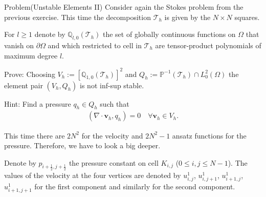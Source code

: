 \begin {blocktheorem}{Problem}(Unstable Elements II)
Consider again the Stokes problem from the previous exercise. This time the
decomposition $\mathcal{T}_h$ is given by the $N\times N$ squares.

For $l \geq 1$ denote by $\mathbb{Q}_{l,0}(\mathcal{T}_h)$ the set of globally
continuous functions on $\Omega$ that vanish on $\partial\Omega$ and which
restricted to cell in $\mathcal{T}_h$ are tensor-product polynomials of
maximum degree $l$.

Prove: Choosing $V_h:= [\mathbb{Q}_{1,0}(\mathcal{T}_h)]^2$ and
 $Q_h:=\mathbb{P}^{-1}(\mathcal{T}_h)\cap L_0^2(\Omega)$ the element pair
 $(V_h, Q_h)$ is not inf-sup stable.

Hint: Find a pressure $q_h\in Q_h$ such that
\begin{align*}
 (\nabla \cdot \boldsymbol{v}_h, q_h)=0 \quad \forall \boldsymbol{v}_h\in V_h.
\end{align*}
\begin{solution}
This time there are $2N^2$ for the velocity and $2N^2-1$ ansatz functions for
the pressure. Therefore, we have to look a big deeper.

Denote by $p_{i+\frac12, j+\frac12}$ the pressure constant on cell $K_{i,j}$
($0\leq i,j \leq N-1$). The values of the velocity at the four vertices are
denoted by $u^1_{i,j}$, $u^1_{i,j+1}$, $u^1_{i+1,j}$, $u^1_{i+1,j+1}$ for the
first component and similarly for the second component.


\end{solution}
\end{blocktheorem}
